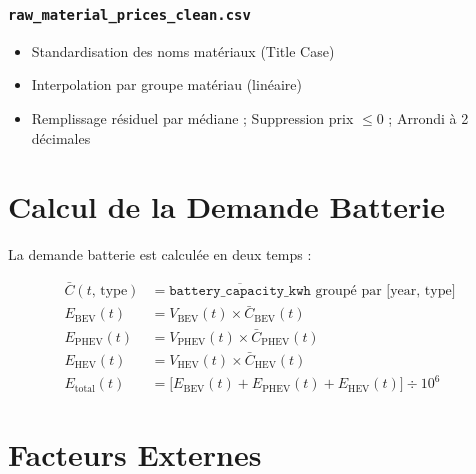 \documentclass[12pt,a4paper]{article}
\begin{document}
\subsubsection{\texttt{raw\_material\_prices\_clean.csv}}
\begin{itemize}
  \item Standardisation des noms matériaux (Title Case)
  \item Interpolation par groupe matériau (linéaire)
  \item Remplissage résiduel par médiane ; Suppression prix $\leq 0$ ; Arrondi à 2 décimales
\end{itemize}

\section{Calcul de la Demande Batterie}

La demande batterie est calculée en deux temps :

\begin{formulebox}
\begin{align}
  \bar{C}(t,\,\text{type}) &= \overline{\texttt{battery\_capacity\_kwh}}
    \text{ groupé par [year, type]} \tag{1} \\[4pt]
  E_{\text{BEV}}(t)  &= V_{\text{BEV}}(t)  \times \bar{C}_{\text{BEV}}(t)  \tag{2} \\
  E_{\text{PHEV}}(t) &= V_{\text{PHEV}}(t) \times \bar{C}_{\text{PHEV}}(t) \tag{3} \\
  E_{\text{HEV}}(t)  &= V_{\text{HEV}}(t)  \times \bar{C}_{\text{HEV}}(t)  \tag{4} \\[4pt]
  E_{\text{total}}(t) &= \bigl[E_{\text{BEV}}(t)
    + E_{\text{PHEV}}(t) + E_{\text{HEV}}(t)\bigr] \div 10^{6} \tag{5}
\end{align}
\end{formulebox}

\section{Facteurs Externes}
\end{document}
